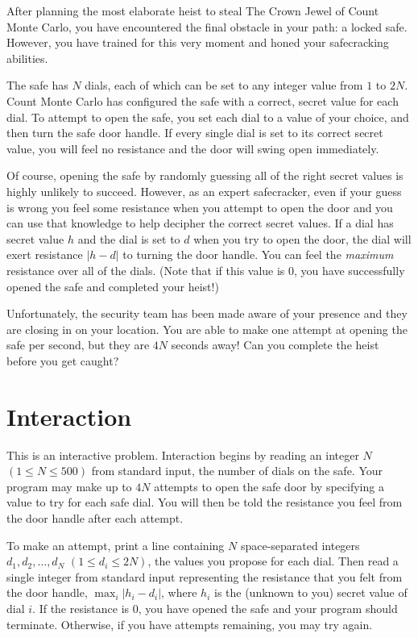 
\newcommand{\theheistmaxn}{500}
After planning the most elaborate heist to steal The Crown Jewel of Count Monte Carlo, you have encountered the final obstacle in your path: a locked safe. However, you have trained for this very moment and honed your safecracking abilities.

The safe has $N$ dials, each of which can be set to any integer value from $1$ to $2N$. Count Monte Carlo has configured the safe with a correct, secret value for each dial. To attempt to open the safe, you set each dial to a value of your choice, and then turn the safe door handle. If every single dial is set to its correct secret value, you will feel no resistance and the door will swing open immediately.

Of course, opening the safe by randomly guessing all of the right secret values is highly unlikely to succeed. However, as an expert safecracker, even if your guess is wrong you feel some resistance when you attempt to open the door and you can use that knowledge to help decipher the correct secret values. If a dial has secret value $h$ and the dial is set to $d$ when you try to open the door, the dial will exert resistance $|h-d|$ to turning the door handle. You can feel the \emph{maximum} resistance over all of the dials. (Note that if this value is $0$, you have successfully opened the safe and completed your heist!)

Unfortunately, the security team has been made aware of your presence and they are closing in on your location. You are able to make one attempt at opening the safe per second, but they are $4N$ seconds away! Can you complete the heist before you get caught?

\section*{Interaction}
This is an interactive problem.
Interaction begins by reading an integer $N$ $(1 \leq N \leq \theheistmaxn)$ from standard input, the number of dials on the safe.
Your program may make up to $4N$ attempts to open the safe door by specifying a value to try for each safe dial. You will then be told the resistance you feel from the door handle after each attempt.

To make an attempt, print a line containing $N$ space-separated integers $d_1, d_2, \ldots, d_N$ $(1 \leq d_i \leq 2N)$, the values you propose for each dial. Then read a single integer from standard input representing the resistance that you felt from the door handle, $\max_i |h_i - d_i|$, where $h_i$ is the (unknown to you) secret value of dial $i$. If the resistance is $0$, you have opened the safe and your program should terminate. Otherwise, if you have attempts remaining, you may try again.

